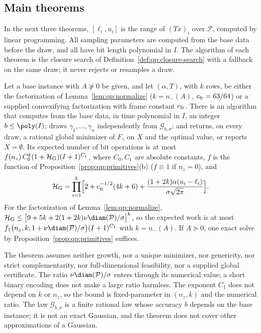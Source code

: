 \subsection{Main theorems}\label{sec:qp:main}

In the next three theorems, $[\ell_i,u_i]$ is the range of $(Tx)_i$ over
$\mathcal P$, computed by linear programming. All sampling parameters are
computed from the base data before the draw, and all have bit length
polynomial in $I$. The algorithm of each theorem is the closure search of
Definition~\ref{def:qp:closure-search} with a fallback on the same draw; it
never rejects or resamples a draw.

\begin{theorem}\label{thm:qp:gauss}
Let a base instance with $A\not\succeq0$ be given, and let $(\alpha,T)$, with
$k$ rows, be either the factorization of Lemma~\ref{lem:qp:normalize}
($k=n_-(A)$, $c_{\rm fr}=63/64$) or a supplied convexifying factorization with
frame constant $c_{\rm fr}$. There
is an algorithm that computes from the base data, in time polynomial in $I$,
an integer $b\le\poly(I)$; draws $\gamma_1,\dots,\gamma_n$ independently from
$\mathcal G_{b,\sigma}$; and returns, on every draw, a rational global
minimizer of $F_\gamma$ on $X$ and the optimal value, or reports $X=\emptyset$.
Its expected number of bit operations is at most
$f(n_z)\,C_0^k(1+\mathcal H_{\rm G})(I+1)^{C_1}$, where $C_0,C_1$ are absolute
constants, $f$ is the function of Proposition~\ref{prop:qp:primitives}(b)
($f\equiv1$ if $n_z=0$), and
\[
 \mathcal H_{\rm G}=\prod_{i=1}^k\Bigl[2+c_{\rm fr}^{-1/2}(4k+6)
 +\frac{(1+2k)\alpha(u_i-\ell_i)}{\sigma\sqrt{2\pi}}\Bigr].
\]
For the factorization of Lemma~\ref{lem:qp:normalize},
$\mathcal H_{\rm G}\le\bigl[9+5k+2(1+2k)\nu\diam(\mathcal P)/\sigma\bigr]^k$,
so the expected work is at most
$f_1\bigl(n_z,k,1+\nu\diam(\mathcal P)/\sigma\bigr)(I+1)^{C_1}$ with
$k=n_-(A)$. If $A\succeq0$, one exact solve by
Proposition~\ref{prop:qp:primitives} suffices.
\end{theorem}

The theorem assumes neither growth, nor a unique minimizer, nor genericity,
nor strict complementarity, nor full-dimensional feasibility, nor a supplied
global certificate. The ratio $\nu\diam(\mathcal P)/\sigma$ enters through its
numerical value; a short binary encoding does not make a large ratio
harmless. The exponent $C_1$ does not depend on $k$ or $n_z$, so the bound is
fixed-parameter in $(n_z,k)$ and the numerical ratio. The law
$\mathcal G_{b,\sigma}$ is a finite rational law whose accuracy $b$ depends on
the base instance; it is not an exact Gaussian, and the theorem does not
cover other approximations of a Gaussian.

